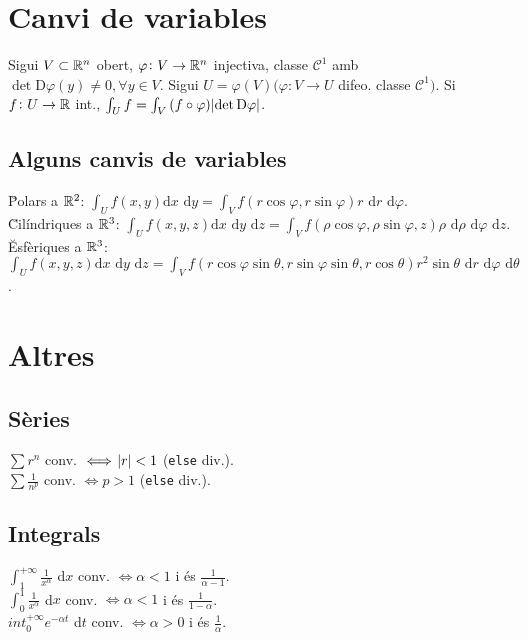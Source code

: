 \section{Canvi de variables}

\ci Sigui $V\subset\mathbb{R}^n$ obert, $\varphi\colon V\to\mathbb{R}^n$ injectiva, classe $\mathcal{C}^1$ amb $\det \text{D}\varphi\left( y \right) \neq 0, \forall y \in V$. Sigui $U = \varphi\left( V \right) (\varphi\colon V\to U$ difeo. classe $\mathcal{C}^1)$. Si $f\colon U\to \mathbb{R}$ int., $\int_U f = \int_V\left( f \circ \varphi \right)\abs{\det \text{D}\varphi}$.

\subsection{Alguns canvis de variables}
\u{Polars a $\mathbb{R}^2$}: $\int_U f\left( x,y \right) \text{d}x\text{ d}y = \int_V f\left( r\cos\varphi, r\sin\varphi \right)r \text{ d}r\text{ d}\varphi$. \\
\u{Cilíndriques a $\mathbb{R}^3$}: $\int_U f\left( x,y,z \right) \text{d}x\text{ d}y\text{ d}z = \int_V f\left( \rho\cos\varphi, \rho\sin\varphi, z \right)\rho \text{ d}\rho\text{ d}\varphi\text{ d}z$. \\
\u{Esfèriques a $\mathbb{R}^3$}: $\int_U f\left( x,y,z \right) \text{d}x\text{ d}y\text{ d}z = \int_V f\left( r\cos\varphi\sin\theta, r\sin\varphi\sin\theta, r\cos\theta \right) r^2\sin\theta \text{ d}r\text{ d}\varphi\text{ d}\theta$.



\section{Altres}

\subsection{Sèries}
\ci $\sum r^n$ conv. $\iff \abs{r} < 1$ (\verb|else| div.). \\
\ci $\sum \frac{1}{n^p}$ conv. $\iff p > 1$ (\verb|else| div.).

\subsection{Integrals}
\ci $\int_1^{+\infty} \frac{1}{x^\alpha}$ d$x$ conv. $\iff \alpha < 1$ i és $\frac{1}{\alpha-1}$. \\
\ci $\int_0^1 \frac{1}{x^\alpha}$ d$x$ conv. $\iff \alpha < 1$ i és $\frac{1}{1-\alpha}$. \\
\ci $int_0^{+\infty} e^{-\alpha t}$ d$t$ conv. $\iff \alpha > 0$ i és $\frac{1}{\alpha}$.

